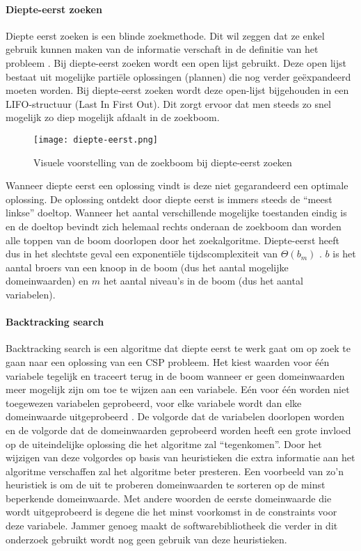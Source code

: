 \paragraph{Diepte-eerst zoeken}
Diepte eerst zoeken is een blinde zoekmethode. Dit wil zeggen dat ze enkel gebruik kunnen maken van de informatie verschaft in de definitie van het probleem \autocite{lievens}. Bij diepte-eerst zoeken wordt een open lijst gebruikt. Deze open lijst bestaat uit mogelijke partiële oplossingen (plannen) die nog verder geëxpandeerd moeten worden. Bij diepte-eerst zoeken wordt deze open-lijst bijgehouden in een LIFO-structuur (Last In First Out). Dit zorgt ervoor dat men steeds zo snel mogelijk zo diep mogelijk afdaalt in de zoekboom. \begin{figure}[h]
	\texttt{[image: diepte-eerst.png]}
	\caption{Visuele voorstelling van de zoekboom bij diepte-eerst zoeken}
\end{figure}
Wanneer diepte eerst een oplossing vindt is deze niet gegarandeerd een optimale oplossing. De oplossing ontdekt door diepte eerst is immers steeds de ``meest linkse'' doeltop. Wanneer het aantal verschillende mogelijke toestanden eindig is en de doeltop bevindt zich helemaal rechts onderaan de zoekboom dan worden alle toppen van de boom doorlopen door het zoekalgoritme. Diepte-eerst heeft dus in het slechtste geval een exponentiële tijdscomplexiteit van $\Theta(b_{m})$ \autocite{lievens}. $b$ is het aantal broers van een knoop in de boom (dus het aantal mogelijke domeinwaarden) en $m$ het aantal niveau's in de boom (dus het aantal variabelen).

\paragraph{Backtracking search}
Backtracking search is een algoritme dat diepte eerst te werk gaat om op zoek te gaan naar een oplossing van een CSP probleem. Het kiest waarden voor één variabele tegelijk en traceert terug in de boom wanneer er geen domeinwaarden meer mogelijk zijn om toe te wijzen aan een variabele. Eén voor één worden niet toegewezen variabelen geprobeerd, voor elke variabele wordt dan elke domeinwaarde uitgeprobeerd \autocite{norvig}. De volgorde dat de variabelen doorlopen worden en de volgorde dat de domeinwaarden geprobeerd worden heeft een grote invloed op de uiteindelijke oplossing die het algoritme zal ``tegenkomen''. Door het wijzigen van deze volgordes op basis van heuristieken die extra informatie aan het algoritme verschaffen zal het algoritme beter presteren. Een voorbeeld van zo'n heuristiek is om de uit te proberen domeinwaarden te sorteren op de minst beperkende domeinwaarde. Met andere woorden de eerste domeinwaarde die wordt uitgeprobeerd is degene die het minst voorkomst in de constraints voor deze variabele. Jammer genoeg maakt de softwarebibliotheek die verder in dit onderzoek gebruikt wordt nog geen gebruik van deze heuristieken.


